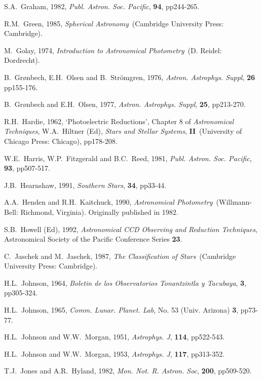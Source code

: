 \documentclass[twoside,11pt]{article}
\begin{document}
\begin{thebibliography}{99}
   S.A.~Graham, 1982, {\it Publ. Astron.
   Soc. Pacific}, {\bf 94}, pp244-265.

   R.M.~Green, 1985, {\it Spherical Astronomy}\,
   (Cambridge University Press: Cambridge).

   M.~Golay, 1974, {\it Introduction to Astronomical
   Photometry}\, (D. Reidel: Dordrecht).

   B.~Gr\o nbech, E.H.~Olsen and B.~Str\"{o}mgren,
   1976, {\it Astron. Astrophys. Suppl}, {\bf 26} pp155-176.

   B.~Gr\o nbech and E.H.~Olsen, 1977, {\it
   Astron. Astrophys. Suppl}, {\bf 25}, pp213-270.

   R.H.~Hardie, 1962, `Photoelectric Reductions',
   Chapter 8 of {\it Astronomical Techniques}, W.A.~Hiltner (Ed), {\it
   Stars and Stellar Systems}, {\bf II}\, (University of Chicago Press:
   Chicago), pp178-208.

   W.E.~Harris, W.P.~Fitzgerald and B.C.~Reed, 1981,
   {\it Publ. Astron. Soc. Pacific}, {\bf 93}, pp507-517.

   J.B.~Hearnshaw, 1991, {\it Southern Stars},
   {\bf 34}, pp33-44.

   A.A.~Henden and R.H.~Kaitchuck, 1990, {\it
   Astronomical Photometry}\, (Willmann-Bell: Richmond, Virginia).
   Originally published in 1982.

   S.B.~Howell (Ed), 1992, {\it Astronomical CCD
   Observing and Reduction Techniques}, Astronomical Society of the
   Pacific Conference Series {\bf 23}.

   C.~Jaschek and M.~Jaschek, 1987, {\it The
  Classification of Stars}\, (Cambridge University Press: Cambridge).

   H.L.~Johnson, 1964, {\it Boletin de los
   Observatorios Tonantzintla y Tacubaya}, {\bf 3}, pp305-324.

   H.L.~Johnson, 1965, {\it Comm. Lunar. Planet.
   Lab}, No. 53 (Univ. Arizona) {\bf 3}, pp73-77.

   H.L.~Johnson and W.W.~Morgan, 1951, {\it
   Astrophys. J}, {\bf 114}, pp522-543.

   H.L.~Johnson and W.W.~Morgan, 1953, {\it
   Astrophys. J}, {\bf 117}, pp313-352.

   T.J.~Jones and A.R.~Hyland, 1982, {\it Mon. Not. R.
   Astron. Soc}, {\bf 200}, pp509-520.


\end{thebibliography}
\end{document}
